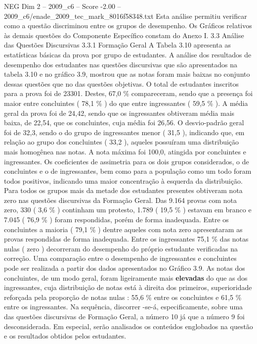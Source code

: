 \begin{textsample}{NEG Dim 2 – 2009\_c6 – Score -2.00 – 2009\_c6/enade\_2009\_tec\_mark\_8016f58348.txt}
Esta análise permitiu verificar como a questão discriminou entre os grupos de desempenho.
Os Gráficos relativos às demais questões do Componente Específico constam do Anexo I. 3.3 Análise das Questões Discursivas 3.3.1 Formação Geral A Tabela 3.10 apresenta as estatísticas básicas da prova por grupo de estudantes.
A análise dos resultados de desempenho dos estudantes nas questões discursivas que são apresentados na tabela 3.10 e no gráfico 3.9, mostrou que as notas foram mais baixas no conjunto dessas questões que no das questões objetivas.
O total de estudantes inscritos para a prova foi de 23301.
Destes, 67,0 \% compareceram, sendo que a presença foi maior entre concluintes ( 78,1 \% ) do que entre ingressantes ( 59,5 \% ).
A média geral da prova foi de 24,42, sendo que os ingressantes obtiveram média mais baixa, de 22,54, que os concluintes, cuja média foi 26,56.
O desvio-padrão geral foi de 32,3, sendo o do grupo de ingressantes menor ( 31,5 ), indicando que, em relação ao grupo dos concluintes ( 33,2 ), aqueles possuíram uma distribuição mais homogênea nas notas.
A nota máxima foi 100,0, atingida por concluintes e ingressantes.
Os coeficientes de assimetria para os dois grupos considerados, o de concluintes e o de ingressantes, bem como para a população como um todo foram todos positivos, indicando uma maior concentração à esquerda da distribuição.
Para todos os grupos mais da metade dos estudantes presentes obtiveram nota zero nas questões discursivas da Formação Geral.
Das 9.164 provas com nota zero, 330 ( 3,6 \% ) continham um protesto, 1.789 ( 19,5 \% ) estavam em branco e 7.045 ( 76,9 \% ) foram respondidas, porém de forma inadequada.
Entre os concluintes a maioria ( 79,1 \% ) dentre aqueles com nota zero apresentaram as provas respondidas de forma inadequada.
Entre os ingressantes 75,1 \% das notas nulas ( zero ) decorreram do desempenho do próprio estudante verificadas na correção.
Uma comparação entre o desempenho de ingressantes e concluintes pode ser realizada a partir dos dados apresentados no Gráfico 3.9.
As notas dos concluintes, de um modo geral, foram ligeiramente mais \textbf{elevadas} do que as dos ingressantes, cuja distribuição de notas está à direita dos primeiros, superioridade reforçada pela proporção de notas nulas : 55,6 \% entre os concluintes e 61,5 \% entre os ingressantes.
Na sequência, discorrer -se-á, especificamente, sobre uma das questões discursivas de Formação Geral, a número 10 já que a número 9 foi desconsiderada.
Em especial, serão analisados os conteúdos englobados na questão e os resultados obtidos pelos estudantes.

\end{textsample}
